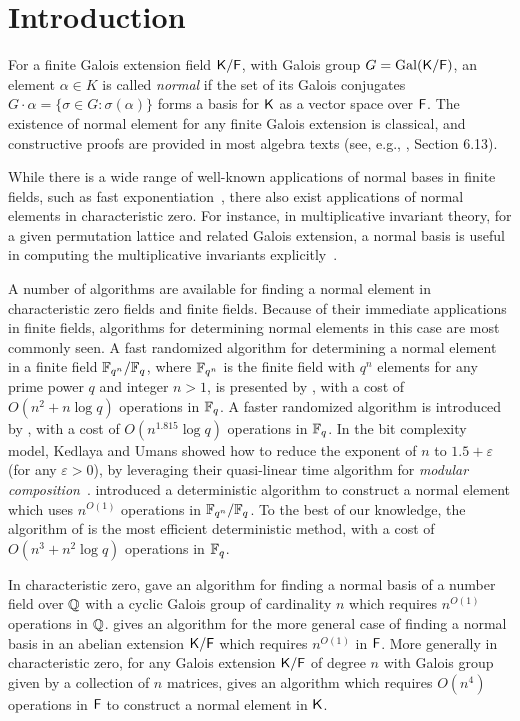 \section{Introduction}

For a finite Galois extension field ${\mathsf{K}}/{\mathsf{F}}$, with Galois group $G =
\mathrm{Gal}({\mathsf{K}}/{\mathsf{F}})$, an element $\alpha \in K$ is called
\emph{normal} if the set of its Galois conjugates $G \cdot \alpha =
\{\sigma\in G: \sigma(\alpha)\}$ forms a basis for ${\mathsf{K}}$ as a vector space over
${\mathsf{F}}$. The existence of normal element for any finite Galois extension
is classical, and constructive proofs are provided in most algebra texts
(see, e.g., \cite{Lang}, Section 6.13).
 
While there is a wide range of well-known applications of normal bases in
finite fields, such as fast exponentiation~\cite{GaGaPaSh00}, there also
exist applications of normal elements in characteristic zero.  For instance,
in multiplicative invariant theory, for a given permutation lattice and
related Galois extension, a normal basis is useful in computing the
multiplicative invariants explicitly~\cite{Jam18}.

A number of algorithms are available for finding a normal element in
characteristic zero fields and finite fields.  Because of their immediate
applications in finite fields, algorithms for determining normal elements
in this case are most commonly seen.  A fast randomized algorithm for
determining a normal element in a finite field ${\mathbb{F}}_{q^n}/{\mathbb{F}}_q$, where
${\mathbb{F}}_{q^n}$ is the finite field with $q^n$ elements for any prime power $q$
and integer $n>1$, is presented by , with a cost of
$O(n^2+n\log q)$ operations in ${\mathbb{F}}_q$.  A faster randomized algorithm is
introduced by , with a cost of $O(n^{1.815}\log q)$
operations in ${\mathbb{F}}_q$.  In the bit complexity model, Kedlaya and Umans showed
how to reduce the exponent of $n$ to $1.5+\varepsilon$ (for any
$\varepsilon > 0$), by leveraging their quasi-linear time algorithm for
{\em modular composition}~\cite{KeUm11}.  introduced a
deterministic algorithm to construct a normal element which uses $n^{O(1)}$
operations in ${\mathbb{F}}_{q^n}/{\mathbb{F}}_q$.  To the best of our knowledge, the
algorithm of  is the most efficient deterministic method,
with a cost of $O(n^3+n^2\log q)$ operations in ${\mathbb{F}}_q$.

In characteristic zero,  gave an algorithm for finding
a normal basis of a number field over $\mathbb{Q}$ with a cyclic Galois group
of cardinality $n$ which requires $n^{O(1)}$ operations in $\mathbb{Q}$.
 gives an algorithm for the more general case of finding
a normal basis in an abelian extension ${\mathsf{K}}/{\mathsf{F}}$ which requires
$n^{O(1)}$ in ${\mathsf{F}}$.  More generally in characteristic zero, for any
Galois extension ${\mathsf{K}}/{\mathsf{F}}$ of degree $n$ with Galois group given by a
collection of $n$ matrices,  gives an algorithm which
requires $O(n^4)$ operations in ${\mathsf{F}}$ to construct a normal element in
${\mathsf{K}}$.

